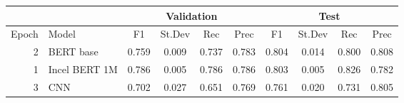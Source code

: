 \begin{tabular}{rl|cccc|cccc}
  \hline
                &                    &  \multicolumn{4}{c|}{Validation}              & \multicolumn{4}{c}{Test} \\
  \hline
          Epoch &              Model &      F1 &      St.Dev &   Rec & Prec &       F1 &       St.Dev &  Rec   &  Prec \\
  \hline
      2 &     BERT base &   0.759 &          0.009 &    0.737 &     0.783 &    0.804 &           0.014 &     0.800 &      0.808 \\
      1 & Incel BERT 1M &   0.786 &          0.005 &    0.786 &     0.786 &    0.803 &           0.005 &     0.826 &      0.782 \\
      3 &           CNN &   0.702 &          0.027 &    0.651 &     0.769 &    0.761 &           0.020 &     0.731 &      0.805 \\
  \hline
\end{tabular}
